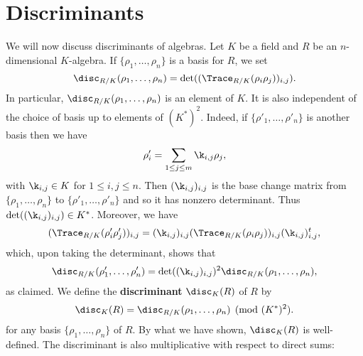   \section{Discriminants}
    We will now discuss discriminants of algebras. Let $K$ be a field and $R$ be an $n$-dimensional $K$-algebra. If $\{\rho_{1},\ldots,\rho_{n}\}$ is a basis for $R$, we set
    \[
      \disc_{R/K}(\rho_{1},\ldots,\rho_{n}) = \det((\Trace_{R/K}(\rho_{i}\rho_{j}))_{i,j}).
    \]
    In particular, $\disc_{R/K}(\rho_{1},\ldots,\rho_{n})$ is an element of $K$. It is also independent of the choice of basis up to elements of $(K^{\ast})^{2}$. Indeed, if $\{\rho'_{1},\ldots,\rho'_{n}\}$ is another basis then we have
    \[
      \rho'_{i} = \sum_{1 \le j \le m}\k_{i,j}\rho_{j},
    \]
    with $\k_{i,j} \in K$ for $1 \le i,j \le n$. Then $(\k_{i,j})_{i,j}$ is the base change matrix from $\{\rho_{1},\ldots,\rho_{n}\}$ to $\{\rho'_{1},\ldots,\rho'_{n}\}$ and so it has nonzero determinant. Thus $\det((\k_{i,j})_{i,j}) \in K^{\ast}$. Moreover, we have
    \[
      (\Trace_{R/K}(\rho'_{i}\rho'_{j}))_{i,j} = (\k_{i,j})_{i,j}(\Trace_{R/K}(\rho_{i}\rho_{j}))_{i,j}(\k_{i,j})_{i,j}^{t},
    \]
    which, upon taking the determinant, shows that
    \begin{equation}\label{equ:discriminant_base_change}
      \disc_{R/K}(\rho'_{1},\ldots,\rho'_{n}) = \det((\k_{i,j})_{i,j})^{2}\disc_{R/K}(\rho_{1},\ldots,\rho_{n}),
    \end{equation}
    as claimed. We define the \textbf{discriminant} $\disc_{K}(R)$ of $R$ by
    \[
      \disc_{K}(R) = \disc_{R/K}(\rho_{1},\ldots,\rho_{n}) \pmod{(K^{\ast})^{2}}.
    \]
    for any basis $\{\rho_{1},\ldots,\rho_{n}\}$ of $R$. By what we have shown, $\disc_{K}(R)$ is well-defined. The discriminant is also multiplicative with respect to direct sums:

